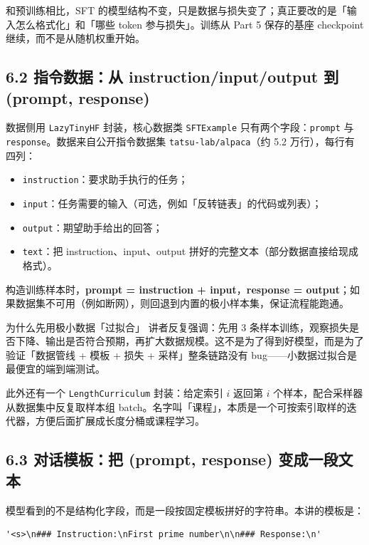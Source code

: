 和预训练相比，SFT 的模型结构不变，只是数据与损失变了；真正要改的是「输入怎么格式化」和「哪些 token 参与损失」。训练从 Part 5 保存的基座 checkpoint 继续，而不是从随机权重开始。

\subsection{6.2 指令数据：从 instruction/input/output 到 (prompt, response)}

数据侧用 \texttt{LazyTinyHF} 封装，核心数据类 \texttt{SFTExample} 只有两个字段：\texttt{prompt} 与 \texttt{response}。数据来自公开指令数据集 \texttt{tatsu-lab/alpaca}（约 5.2 万行），每行有四列：

\begin{itemize}
\item \texttt{instruction}：要求助手执行的任务；
\item \texttt{input}：任务需要的输入（可选，例如「反转链表」的代码或列表）；
\item \texttt{output}：期望助手给出的回答；
\item \texttt{text}：把 instruction、input、output 拼好的完整文本（部分数据直接给现成格式）。
\end{itemize}

构造训练样本时，\textbf{prompt = instruction + input}，\textbf{response = output}；如果数据集不可用（例如断网），则回退到内置的极小样本集，保证流程能跑通。

\begin{knowledgebox}{为什么先用极小数据「过拟合」}
讲者反复强调：先用 3 条样本训练，观察损失是否下降、输出是否符合预期，再扩大数据规模。这不是为了得到好模型，而是为了验证「数据管线 + 模板 + 损失 + 采样」整条链路没有 bug——小数据过拟合是最便宜的端到端测试。
\end{knowledgebox}

此外还有一个 \texttt{LengthCurriculum} 封装：给定索引 $i$ 返回第 $i$ 个样本，配合采样器从数据集中反复取样本组 batch。名字叫「课程」，本质是一个可按索引取样的迭代器，方便后面扩展成长度分桶或课程学习。

\subsection{6.3 对话模板：把 (prompt, response) 变成一段文本}

模型看到的不是结构化字段，而是一段按固定模板拼好的字符串。本讲的模板是：

\begin{lstlisting}[caption={SFT 对话模板（渲染后的实际字符串）}]
'<s>\n### Instruction:\nFirst prime number\n\n### Response:\n'
\end{lstlisting}

